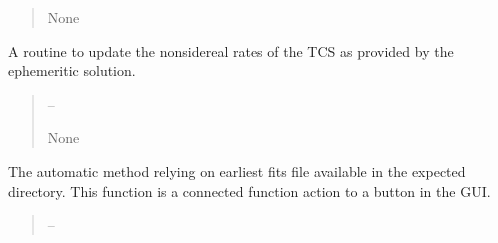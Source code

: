 \documentclass[letterpaper,11pt,english]{sphinxmanual}
\begin{document}
\begin{savenotes}
\begin{fulllineitems}
\begin{savenotes}
\begin{fulllineitems}
\begin{quote}
\begin{description}
\sphinxAtStartPar
None

\end{description}\end{quote}

\end{fulllineitems}\end{savenotes}


\begin{savenotes}\begin{fulllineitems}
\label{\detokenize{code/opihiexarata.gui.manual:opihiexarata.gui.manual.OpihiManualWindow.__connect_push_button_ephemeris_update_tcs_rate}}
\pysigstartsignatures
{}
\pysigstopsignatures
\sphinxAtStartPar
A routine to update the non\sphinxhyphen{}sidereal rates of the TCS as provided
by the ephemeritic solution.
\begin{quote}\begin{description}
\sphinxAtStartPar
{} – 

\sphinxAtStartPar
None

\end{description}\end{quote}

\end{fulllineitems}\end{savenotes}


\begin{savenotes}\begin{fulllineitems}
\label{\detokenize{code/opihiexarata.gui.manual:opihiexarata.gui.manual.OpihiManualWindow.__connect_push_button_new_image_automatic}}
\pysigstartsignatures
{}
\pysigstopsignatures
\sphinxAtStartPar
The automatic method relying on earliest fits file available in
the expected directory. This function is a connected function action to
a button in the GUI.
\begin{quote}\begin{description}
\sphinxAtStartPar
{} – 


\end{description}
\end{quote}
\end{fulllineitems}
\end{savenotes}
\end{fulllineitems}
\end{savenotes}
\end{document}
